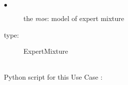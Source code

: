 \requirements{-
}
             {
               \begin{description}
               \item[$\bullet$] the {\itshape moe}: model of expert mixture
               \item[type:] ExpertMixture
               \end{description}
             }

             \textspace\\
             Python script for this Use Case :

